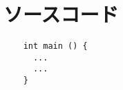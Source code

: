 \documentclass[master]{cimt}
\begin{document}
\maketitle 

\frontmatter{}

\begin{jabstract}
  
\end{jabstract}

\begin{eabstract}
  
\end{eabstract}

\setcounter{tocdepth}{1}
\tableofcontents
\listoffigures
\listoftables

\mainmatter{}








\backmatter{}





\begin{acknowledgements}

\end{acknowledgements}

\appendix


\chapter{ソースコード}
  \begin{verbatim}
    int main () {
      ...
      ...
    }
  \end{verbatim}
\end{document}
